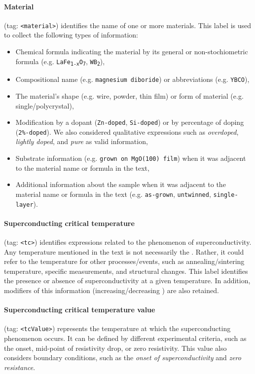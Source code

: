 \paragraph{Material} (tag: \texttt{<material>}) identifies the name of one or more materials. 
This label is used to collect the following types of information: 
\begin{itemize}
    \item Chemical formula indicating the material by its general or non-stochiometric formula (e.g. \texttt{LaFe\textsubscript{1-x}O\textsubscript{7}}, \texttt{WB\textsubscript{2}}),
    \item Compositional name (e.g. \texttt{magnesium diboride}) or abbreviations (e.g. \texttt{YBCO}), 
    \item The material's shape (e.g. wire, powder, thin film) or form of material (e.g. single/polycrystal), 
    \item Modification by a dopant (\texttt{Zn-doped}, \texttt{Si-doped}) or by percentage of doping (\texttt{2\%-doped}). We also considered qualitative expressions such as \textit{overdoped}, \textit{lightly doped}, and \textit{pure} as valid information, 
    \item Substrate information (e.g. \texttt{grown on MgO(100) film}) when it was adjacent to the material name or formula in the text,
    \item Additional information about the sample when it was adjacent to the material name or formula in the text (e.g. \texttt{as-grown}, \texttt{untwinned}, \texttt{single-layer}). 
\end{itemize}

\paragraph{Superconducting critical temperature} (tag: \texttt{<tc>}) identifies expressions related to the phenomenon of superconductivity. Any temperature mentioned in the text is not necessarily the \tc. Rather, it could refer to the temperature for other processes/events, such as annealing/sintering temperature, specific measurements, and structural changes.
This label identifies the presence or absence of superconductivity at a given temperature.
In addition, modifiers of this information (increasing/decreasing \tc) are also retained. 

\paragraph{Superconducting critical temperature value} (tag: \texttt{<tcValue>}) represents the temperature at which the superconducting phenomenon occurs. 
It can be defined by different experimental criteria, such as the onset, mid-point of resistivity drop, or zero resistivity.
This value also considers boundary conditions, such as the \textit{onset of superconductivity} and \textit{zero resistance}. 

